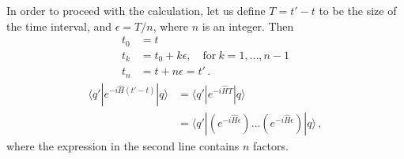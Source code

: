 In order to proceed with the calculation, let us define $T=t'-t$ to be
the size of the time interval, and $\epsilon=T/n$, where $n$ is an
integer. Then 
\begin{align}
  t_0 &= t \\
  t_k &= t_0 + k \epsilon, \quad \text{for}\ k=1, \ldots, n-1 \\
  t_n &= t + n \epsilon = t'\, .
\end{align}
\begin{align}
  \langle q' | e^{-i \hat{H} (t'-t)}|q\rangle &= 
                 \langle q' | e^{-i \hat{H} T} | q\rangle \\
               &= \langle q' | \left(e^{-i \hat{H} \epsilon}\right)
                 \ldots \left(e^{-i \hat{H} \epsilon}\right) |
                 q\rangle\, ,
\end{align}
where the expression in the second line contains $n$ factors. 

